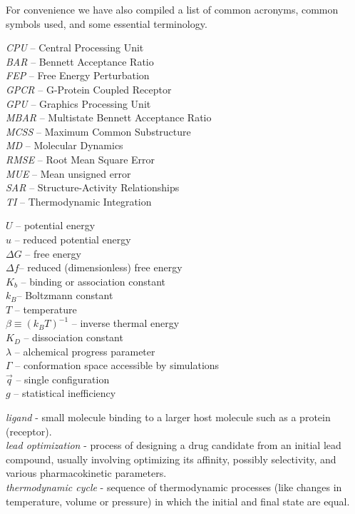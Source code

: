 \documentclass[9pt,bestpractices]{livecoms}
\begin{document}
For convenience we have also compiled a list of common acronyms, common symbols used, and some essential terminology.
\begin{tcolorbox}[title=Acronyms, colback=blue!10!white]
    \textit{CPU} -- Central Processing Unit\\
    \textit{BAR} -- Bennett Acceptance Ratio\\
    \textit{FEP} -- Free Energy Perturbation\\
    \textit{GPCR} -- G-Protein Coupled Receptor\\
    \textit{GPU} -- Graphics Processing Unit\\
    \textit{MBAR} -- Multistate Bennett Acceptance Ratio\\
    \textit{MCSS} -- Maximum Common Substructure\\
    \textit{MD} -- Molecular Dynamics\\
    \textit{RMSE} -- Root Mean Square Error\\
    \textit{MUE} -- Mean unsigned error\\
    \textit{SAR} -- Structure-Activity Relationships\\
    \textit{TI} -- Thermodynamic Integration
\end{tcolorbox}
\begin{tcolorbox}[title=List of Symbols, colback=green!10!white]
$U$ -- potential energy\\
$u$ -- reduced potential energy \\
$\Delta G$ -- free energy \\
$\Delta f$-- reduced (dimensionless) free energy \\
$K_b$ -- binding or association constant \\
$k_B$-- Boltzmann constant \\
$T$ -- temperature \\
$\beta \equiv (k_B T)^{-1}$ -- inverse thermal energy \\
$K_D$ -- dissociation constant \\
$\lambda$ -- alchemical progress parameter \\
$\Gamma$ -- conformation space accessible by simulations \\
$\vec{q}$ -- single configuration\\
$g$ -- statistical inefficiency
\end{tcolorbox}
\begin{tcolorbox}[title=Common terminology, colback=yellow!10!white]
    \emph{ligand} - small molecule binding to a larger host molecule such as a protein (receptor).\\ 
    \emph{lead optimization} - process of designing a drug candidate from an initial lead compound, usually involving optimizing its affinity, possibly selectivity, and various pharmacokinetic parameters.\\
    \emph{thermodynamic cycle} - sequence of thermodynamic processes (like changes in temperature, volume or pressure) in which the initial and final state are equal.\\
\end{tcolorbox}
%
\end{document}
